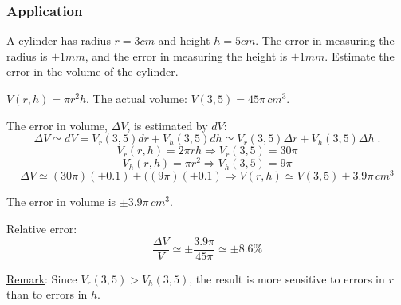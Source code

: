 \begin{frame}
  \frametitle{Application}

  A cylinder has radius $r=3cm$ and height $h=5cm$. The error in measuring the radius is $\pm 1 mm$, and the error in measuring the height is $\pm 1 mm$. Estimate the error in the volume of the cylinder.
\pause
\bigskip

$V(r,h) = \pi r^2 h$. The actual volume: $V(3,5) = 45\pi \, cm^3$.

\pause
The error in volume, $\Delta V$, is estimated by $dV$:
%
$$\Delta V \simeq dV = V _r(3,5) dr + V_h(3,5) dh \simeq V _r(3,5) \Delta r + V_h(3,5) \Delta h\; .$$
%
$$V_r(r,h) = 2\pi r h \Longrightarrow V_r(3,5) = 30 \pi$$
%
$$V_h(r,h) = \pi r^2 \Longrightarrow V_h(3,5) = 9\pi$$
%
$$\Delta V  \simeq (30\pi) (\pm 0.1) + ((9\pi)(\pm 0.1) \Longrightarrow V(r,h) \simeq V(3,5) \pm 3.9\pi \, cm^3$$

The error in volume is $\pm 3.9\pi \, cm^3$.

\pause
Relative error:
%
$$\frac{\Delta V}{V} \simeq \pm \frac{3.9 \pi}{45\pi} \simeq \pm 8.6\%$$

\medskip
\pause
\underline{Remark}: Since $V_r(3,5) > V_h(3,5)$, the result is more sensitive to errors in $r$ than to errors in $h$.
\end{frame}